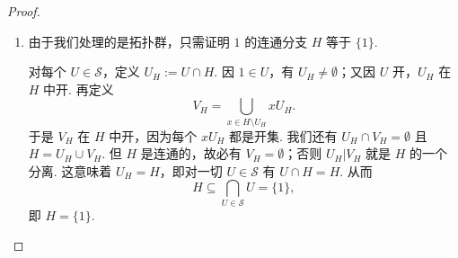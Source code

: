 \begin{proof}
\begin{enumerate}
    \textbf{开映射：}设 $\mathbb{E}\in\mathcal{F}_{\mathbb{L}}$，则
    \[
    h(\operatorname{Gal}(\mathbb{L},\mathbb{E}))=h(G)\cap\big(\prod_{\substack{\mathbb{E}'\neq\mathbb{E}\\ \mathbb{E}'\in\mathcal{F}_{\mathbb{L}}}}\operatorname{Gal}(\mathbb{E}',\mathbb{K})\times\{1\}\big),
    \]
    这是 $h(G)$ 中的开集.

    \textbf{$h(G)$ 闭：}对每对满足 $\mathbb{E}_{2}\subseteq\mathbb{E}_{1}$ 的 $\mathbb{E}_{1},\mathbb{E}_{2}\in\mathcal{F}_{\mathbb{L}}$，定义 $M_{\mathbb{E}_{1}|\mathbb{E}_{2}}:=\{\Sigma\in P\mid \pi_{\mathbb{E}_{1}}(\Sigma)|_{\mathbb{E}_{2}}=\pi_{\mathbb{E}_{2}}(\Sigma)\}$. 我们先证 $M_{\mathbb{E}_{1}|\mathbb{E}_{2}}$ 在 $P$ 中闭. 由于 $\mathbb{E}_{2}$ 是 $\mathbb{K}$ 的有限扩张，可设 $\operatorname{Gal}(\mathbb{E}_{2},\mathbb{K})=\{f_{1},\ldots,f_{r}\}$. 以 $S_{i}$ 记 $f_{i}$ 到 $\mathbb{E}_{1}$ 的扩张之集. 于是
    \[
    M_{\mathbb{E}_{1}|\mathbb{E}_{2}}=\bigcup_{i=1}^{r}\big(\prod_{\substack{\mathbb{E}\neq\mathbb{E}_{1},\mathbb{E}_{2}\\ \mathbb{E}\in\mathcal{F}_{\mathbb{L}}}}\operatorname{Gal}(\mathbb{E},\mathbb{K})\times S_{i}\times\{f_{i}\}\big).
    \]
    有限并中的每个集合都是闭集（作为闭集之积），故 $M_{\mathbb{E}_{1}|\mathbb{E}_{2}}$ 闭.

    我们有
    \[
    h(G)\subseteq\bigcap_{\mathbb{E}_{1}\supseteq\mathbb{E}_{2}}M_{\mathbb{E}_{1}|\mathbb{E}_{2}}
    \]
    若能证明反包含，就得 $h(G)$ 在 $P$ 中闭. 现在，若 $\Sigma\in\bigcap_{\mathbb{E}_{1}\supseteq\mathbb{E}_{2}}M_{\mathbb{E}_{1}|\mathbb{E}_{2}}$，当 $x\in\mathbb{E}$ 时定义 $\sigma(x)=\pi_{\mathbb{E}}(\Sigma)(x)$，这就给出一个自同构 $\sigma:\mathbb{L}\to\mathbb{L}$. 由 $\Sigma\in\cap M_{\mathbb{E}_{1}|\mathbb{E}_{2}}$（并利用\autoref{c2-rem-2-2}），这样的 $\sigma$ 是良定义的. 我们有 $h(\sigma)=\prod_{\mathbb{E}\in\mathcal{F}_{\mathbb{L}}}\pi_{\mathbb{E}}(\Sigma)$，从而
    \[
    h(G)\supseteq\bigcap_{\mathbb{E}_{1}\supseteq\mathbb{E}_{2}}M_{\mathbb{E}_{1}|\mathbb{E}_{2}},
    \]
    故 $h(G)$ 闭.
    \item 由于我们处理的是拓扑群，只需证明 $1$ 的连通分支 $H$ 等于 $\{1\}$.

    对每个 $U\in\mathcal{S}$，定义 $U_{H}:=U\cap H$. 因 $1\in U$，有 $U_{H}\neq\emptyset$；又因 $U$ 开，$U_{H}$ 在 $H$ 中开. 再定义
    \[
    V_{H}=\bigcup_{x\in H\setminus U_{H}}xU_{H}.
    \]
    于是 $V_{H}$ 在 $H$ 中开，因为每个 $xU_{H}$ 都是开集. 我们还有 $U_{H}\cap V_{H}=\emptyset$ 且 $H=U_{H}\cup V_{H}$. 但 $H$ 是连通的，故必有 $V_{H}=\emptyset$；否则 $U_{H}|V_{H}$ 就是 $H$ 的一个分离. 这意味着 $U_{H}=H$，即对一切 $U\in\mathcal{S}$ 有 $U\cap H=H$. 从而
    \[
    H\subseteq\bigcap_{U\in\mathcal{S}}U=\{1\},
    \]
    即 $H=\{1\}$.
\end{enumerate}
\end{proof}

